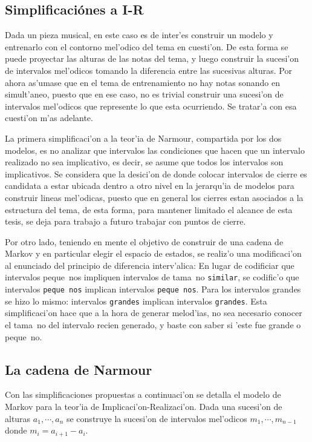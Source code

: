 \subsection{Simplificaci\'ones a I-R}
Dada un pieza musical, en este caso es de inter'es construir un modelo y entrenarlo con el contorno mel'odico del tema en cuesti'on. De esta forma se puede proyectar
las alturas de las notas del tema, y luego construir la sucesi'on de intervalos mel'odicos tomando la diferencia entre las sucesivas alturas. Por ahora as'umase que 
en el tema de entrenamiento no hay notas sonando en simult'aneo, puesto que en ese caso, no es trivial construir una sucesi'on de intervalos mel'odicos que represente
lo que esta ocurriendo. Se tratar'a con esa cuesti'on m'as adelante.

La primera simplificaci'on a la teor'ia de Narmour, compartida por los dos modelos, es no analizar que intervalos las condiciones que hacen que un intervalo realizado
no sea implicativo, es decir, se asume que todos los intervalos son implicativos. Se considera que la desici'on de donde colocar intervalos de cierre es candidata 
a estar ubicada dentro a otro nivel en la jerarqu'ia de modelos para construir lineas mel'odicas, puesto que en general los cierres estan asociados a la estructura
del tema, de esta forma, para mantener limitado el alcance de esta tesis, se deja para trabajo a futuro trabajar con puntos de cierre.

Por otro lado, teniendo en mente el objetivo de construir de una cadena de Markov y en particular elegir el espacio de estados, se realiz'o una modificaci'on al enunciado 
del principio de diferencia interv'alica: En lugar de codificiar que intervalos peque~nos impliquen intervalos de tama~no \texttt{similar}, se codific'o que 
intervalos \texttt{peque~nos} implican intervalos \texttt{peque~nos}. Para los intervalos grandes se hizo lo mismo: intervalos \texttt{grandes} implican 
intervalos \texttt{grandes}. Esta simplificaci'on hace que a la hora de generar melod'ias, no sea necesario conocer el tama~no del intervalo recien generado, y baste 
con saber si 'este fue grande o peque~no.

\subsection{La cadena de Narmour}
Con las simplificaciones propuestas a continuaci'on se detalla el modelo de Markov para la teor'ia de Implicaci'on-Realizaci'on.
Dada una sucesi'on de alturas $a_1, \cdots, a_n$ se construye la sucesi'on de intervalos mel'odicos $m_1, \cdots, m_{n-1}$ donde $m_i = a_{i+1}-a_i$. 

